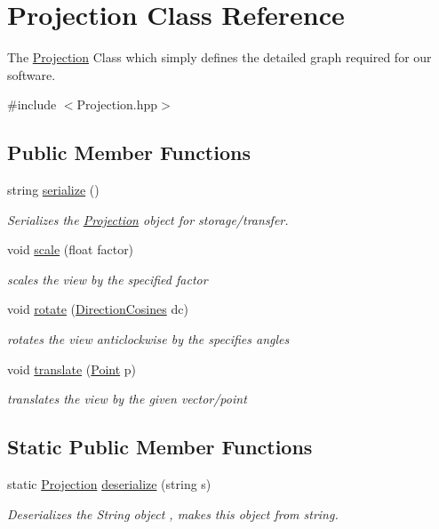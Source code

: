 \hypertarget{class_projection}{}\section{Projection Class Reference}
\label{class_projection}


The \mbox{\hyperlink{class_projection}{Projection}} Class which simply defines the detailed graph required for our software.  




{\ttfamily \#include $<$Projection.\+hpp$>$}

\subsection*{Public Member Functions}
\begin{DoxyCompactItemize}
\item 
string \mbox{\hyperlink{class_projection_ae1fb2fe53361eef4e3e8d44dcd710be2}{serialize}} ()
\begin{DoxyCompactList}\small\item\em Serializes the \mbox{\hyperlink{class_projection}{Projection}} object for storage/transfer. \end{DoxyCompactList}\item 
void \mbox{\hyperlink{class_projection_aba50a4b61db55f82caec3fd15d6c6e61}{scale}} (float factor)
\begin{DoxyCompactList}\small\item\em scales the view by the specified factor \end{DoxyCompactList}\item 
void \mbox{\hyperlink{class_projection_a3e6794ba355fe9bd6e5d42d7133c8be4}{rotate}} (\mbox{\hyperlink{class_direction_cosines}{Direction\+Cosines}} dc)
\begin{DoxyCompactList}\small\item\em rotates the view anticlockwise by the specifies angles \end{DoxyCompactList}\item 
void \mbox{\hyperlink{class_projection_ae8e33f2b836aff2c24b148c1308f1789}{translate}} (\mbox{\hyperlink{class_point}{Point}} p)
\begin{DoxyCompactList}\small\item\em translates the view by the given vector/point \end{DoxyCompactList}\end{DoxyCompactItemize}
\subsection*{Static Public Member Functions}
\begin{DoxyCompactItemize}
\item 
static \mbox{\hyperlink{class_projection}{Projection}} \mbox{\hyperlink{class_projection_ae99d107febc961e7ae8232623d930b82}{deserialize}} (string s)
\begin{DoxyCompactList}\small\item\em Deserializes the String object , makes this object from string. \end{DoxyCompactList}\end{DoxyCompactItemize}
